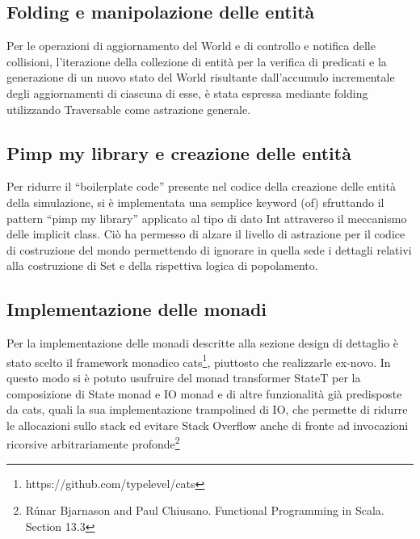 \subsection{Folding e manipolazione delle entità}
Per le operazioni di aggiornamento del World e di controllo e notifica delle collisioni, l’iterazione della collezione di entità per la verifica di predicati e la generazione di un nuovo stato del World risultante dall’accumulo incrementale degli aggiornamenti di ciascuna di esse, è stata espressa mediante folding utilizzando Traversable come astrazione generale.

\subsection{Pimp my library e creazione delle entità}
Per ridurre il “boilerplate code” presente nel codice della creazione delle entità della simulazione, si è implementata una semplice keyword (of) sfruttando il pattern “pimp my library” applicato al tipo di dato Int attraverso il meccanismo delle implicit class. Ciò ha permesso di alzare il livello di astrazione per il codice di costruzione del mondo permettendo di ignorare in quella sede i dettagli relativi alla costruzione di Set e della rispettiva logica di popolamento.

\subsection{Implementazione delle monadi}
Per la implementazione delle monadi descritte alla sezione design di dettaglio è stato scelto il framework monadico cats\footnote{https://github.com/typelevel/cats}, piuttosto che realizzarle ex-novo. In questo modo si è potuto usufruire del monad transformer StateT per la composizione di State monad e IO monad e di altre funzionalità già predisposte da cats, quali la sua implementazione trampolined di IO, che permette di ridurre le allocazioni sullo stack ed evitare Stack Overflow anche di fronte ad invocazioni ricorsive arbitrariamente profonde\footnote{Rúnar Bjarnason and Paul Chiusano. Functional Programming in Scala. Section 13.3}


